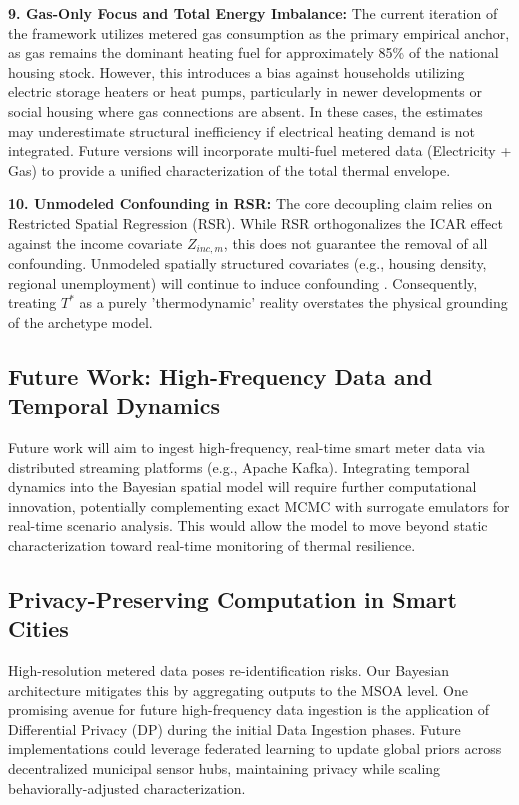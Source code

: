 \documentclass[11pt, a4paper, twocolumn, numbers]{elsarticle}
\begin{document}
\textbf{9. Gas-Only Focus and Total Energy Imbalance:} The current 
iteration of the framework utilizes metered gas consumption as the 
primary empirical anchor, as gas remains the dominant heating fuel for 
approximately 85\% of the national housing stock. However, this 
introduces a bias against households utilizing electric storage heaters 
or heat pumps, particularly in newer developments or social housing 
where gas connections are absent. In these cases, the estimates may 
underestimate structural inefficiency if electrical heating demand is 
not integrated. Future versions will incorporate multi-fuel metered data 
(Electricity + Gas) to provide a unified characterization of the total 
thermal envelope.

\textbf{10. Unmodeled Confounding in RSR:} The core decoupling claim relies on Restricted Spatial Regression (RSR). While RSR orthogonalizes the ICAR effect against the income covariate $Z_{inc, m}$, this does not guarantee the removal of all confounding. Unmodeled spatially structured covariates (e.g., housing density, regional unemployment) will continue to induce confounding \cite{Hanks2015}. Consequently, treating $T^*$ as a purely 'thermodynamic' reality overstates the physical grounding of the archetype model.

\subsection{Future Work: High-Frequency Data and Temporal 
Dynamics}\label{future-work-high-frequency-data-and-temporal-dynamics}

Future work will aim to ingest high-frequency, real-time smart meter 
data via distributed streaming platforms (e.g., Apache Kafka). 
Integrating temporal dynamics into the Bayesian spatial model will 
require further computational innovation, potentially complementing 
exact MCMC with surrogate emulators for real-time scenario analysis. This would allow the model to move beyond 
static characterization toward real-time monitoring of thermal 
resilience.

\subsection{Privacy-Preserving Computation in Smart 
Cities}\label{privacy-preserving-computation-in-smart-cities}

High-resolution metered data poses re-identification risks. Our Bayesian 
architecture mitigates this by aggregating outputs to the MSOA level. 
One promising avenue for future high-frequency data ingestion is the 
application of Differential Privacy (DP) during the initial Data 
Ingestion phases. Future implementations could leverage federated 
learning to update global priors across decentralized municipal sensor 
hubs, maintaining privacy while scaling behaviorally-adjusted 
characterization.
\end{document}
